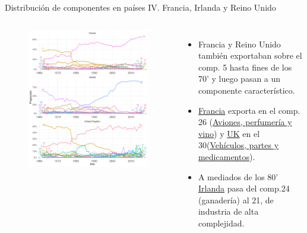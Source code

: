 \documentclass[compress]{beamer}
\begin{document}
\begin{frame}
\small
Distribución de componentes en países IV. Francia, Irlanda y Reino Unido
\scriptsize
\begin{columns}[c] 
	
	\begin{figure}
		\includegraphics[width=\linewidth]{graficoLDA_k30_FRA_GBR_IRL}
	\end{figure}
	
	
	\begin{itemize}[label=\faRebel]
		\item Francia y Reino Unido también exportaban sobre el comp. 5 hasta fines de los 70' y luego pasan a un componente característico.
		\item \underline{Francia} exporta en el comp. 26 (\underline{Aviones, perfumería y vino}) y \underline{UK} en el 30(\underline{Vehículos, partes y medicamentos}).
		\item A mediados de los 80' \underline{Irlanda} pasa del comp.24 (ganadería) al 21, de industria de alta complejidad.
	\end{itemize}
	
\end{columns} 

\end{frame}
\end{document}

